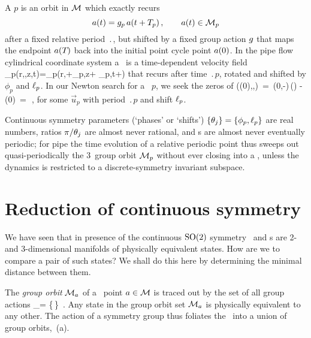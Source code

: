 \documentclass{jfm}
\begin{document}
A {\rpo} $p$ is an orbit in {\statesp} $\pS$ which exactly recurs
\[ %
\ssp(\zeit) = \LieEl_p \, \ssp(\zeit + \period{p} )
    \,,\qquad
\ssp(\zeit) \in \pS_p
\] %
after a fixed {relative period} $\period{}$, but shifted by a fixed group
action ${g}$ that maps the endpoint $a ({T_{}} ) $ back
into the initial point cycle point $a (0) $.
In the pipe flow cylindrical coordinate system
a \rpo\ is a time-dependent velocity field
\beq
\bu_p(r,\theta,z,t)=\bu_p(r,\theta+\phi_p,z+ \shift_p,t+)
that recurs after time $\period{p}$, rotated and shifted by $\phi_p$ and
$\ell_p$.
In our Newton search for a \rpo\ $p$, we seek the zeros of
\beq
   ((0),\period{},\shift)
\,=\, \LieEl(0,-\shift)\,(\period{}) - (0) \,=\, 
\,,
for some $\vec{u}_p$ with period $\period{p}$ and shift $\ell_p$.

Continuous symmetry parameters (`phases' or `shifts')
$\{{\bf \theta}_j\}=\{\phi_p,\ell_p\}$
are real numbers, ratios $\pi/{\bf \theta}_j$ are almost never rational, and
\rpo s are almost never eventually periodic; for pipe the time evolution
of a relative periodic point thus sweeps out quasi-periodically the
$3$\dmn\ group orbit $\pS_p$ without ever closing into a \po, unless the
dynamics is restricted to a discrete-symmetry invariant subspace.



\section{Reduction of continuous symmetry}
\label{s:slice}

We have seen that in presence of the continuous $\textrm{SO}(2)$ symmetry
\reqva\ and \rpo s are 2- and 3-dimensional manifolds of physically
equivalent states. How are we to compare a pair of such states? We shall
do this here by determining the minimal distance between them.

The \emph{group orbit} $\pS_\ssp $ of a \statesp\ point $\ssp \in \pS$ is
traced out by the set of all group actions
\beq
\pS_\ssp = \{\LieEl\,\ssp \mid \LieEl \in {\Group}\}
\,.
Any state in the  group orbit set $\pS_{\ssp}$
is physically equivalent to any other. The action of a symmetry group
thus foliates the \statesp\ into a union of group orbits,
\,(a).
\end{document}
